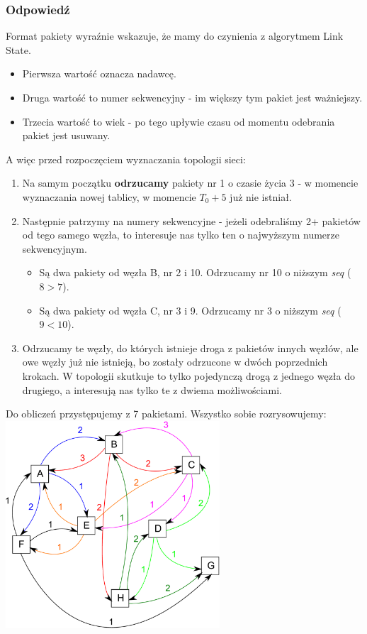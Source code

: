 \documentclass[a4paper,twoside]{article}
\begin{document}
\subsubsection{Odpowiedź}
Format pakiety wyraźnie wskazuje, że mamy do czynienia z algorytmem Link State.
\begin{itemize}
	\item Pierwsza wartość oznacza nadawcę.
	\item Druga wartość to numer sekwencyjny - im większy tym pakiet jest ważniejszy.
	\item Trzecia wartość to wiek - po tego upływie czasu od momentu odebrania pakiet jest usuwany.
\end{itemize}
A więc przed rozpoczęciem wyznaczania topologii sieci:
\begin{enumerate}
	\item Na samym początku \textbf{odrzucamy} pakiety nr 1 o czasie życia 3 - w momencie wyznaczania nowej tablicy, w momencie $ T_0+5 $ już nie istniał.
	\item Następnie patrzymy na numery sekwencyjne - jeżeli odebraliśmy 2+ pakietów od tego samego węzła, to interesuje nas tylko ten o najwyższym numerze sekwencyjnym.
	\begin{itemize}
		\item Są dwa pakiety od węzła B, nr 2 i 10. Odrzucamy nr 10 o niższym \textit{seq} ($ 8 > 7 $).
		\item Są dwa pakiety od węzła C, nr 3 i 9. Odrzucamy nr 3 o niższym \textit{seq} ($ 9 < 10 $).
	\end{itemize}
	\item Odrzucamy te węzły, do których istnieje droga z pakietów innych węzłów, ale owe węzły już nie istnieją, bo zostały odrzucone w dwóch poprzednich krokach. W topologii skutkuje to tylko pojedynczą drogą z jednego węzła do drugiego, a interesują nas tylko te z dwiema możliwościami.
\end{enumerate}
Do obliczeń przystępujemy z 7 pakietami. Wszystko sobie rozrysowujemy:\\
\includegraphics[width=8.0cm]{./images/zadanie05.pdf}
\end{document}
